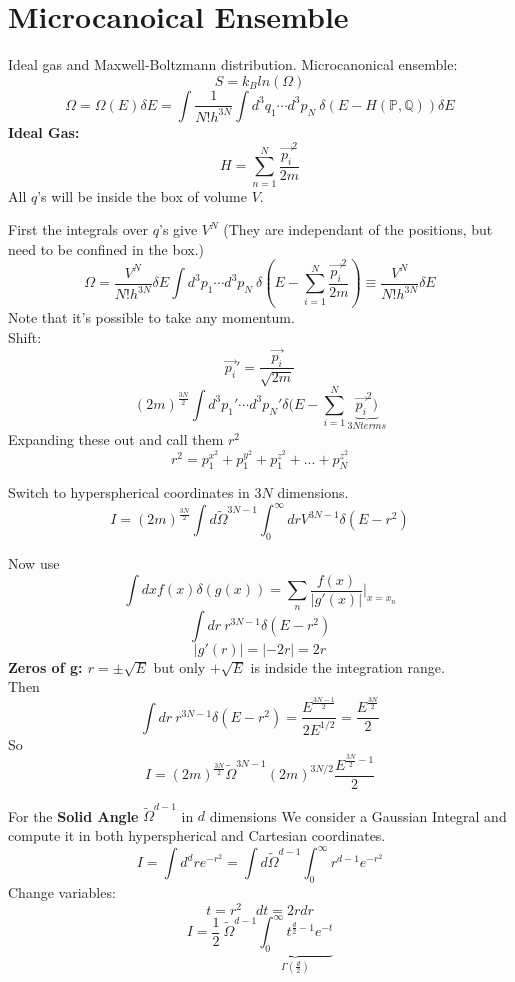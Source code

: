 \documentclass[11pt]{book}
\theoremstyle{definition}
\begin{document}
\section{Microcanoical Ensemble}
Ideal gas and Maxwell-Boltzmann distribution.
Microcanonical ensemble:
\[ S = k_B ln(\Omega) \] 
\[ \Omega = \Omega(E) \delta E  = \int \frac{1}{N!h^{3N}} \int d^3 q_1 \cdots d^3 p_N \: \delta (E- H(\mathbb{P}, \mathbb{Q})) \delta E \] 
\textbf{Ideal Gas:} 
\[ H = \sum_{n=1}^{N} \frac{\vec{p_i}^2}{2m}\] 
All $ q $'s will be inside the box of volume $ V $.

First the integrals over $ q $'s give $ V^{N} $ (They are independant of the positions, but need to be confined in the box.)
\[ \Omega = \frac{V^{N}}{N!h^{3N}} \delta E \int d^3p_1 \cdots d^3 p_N \: \delta (E - \sum_{i=1}^{N} \frac{\vec{p_i}^2}{2m}) \equiv \frac{V^{N}}{N! h^{3N}} \delta E \] 
Note that it's possible to take any momentum. \\
Shift:
\[ \vec{p_i}\prime = \frac{\vec{p_i}}{\sqrt{2m}} \]
\[(2m)^{\frac{3N}{2}} \int d^3p_1 \prime \cdots d^3p_N \prime \delta (E - \sum_{i=1}^{N} \underbrace{\vec{p_i}^2)}_{3N terms}\] 
Expanding these out and call them $ r^2 $
\[ r^2 = p_1^{{x}^2} + p_1^{{y}^2} + p_1^{{z}^2} + ... + p_N^{{z}^2} \] 
\begin{shaded*}
Switch to hyperspherical coordinates in $ 3N $ dimensions.
\[ I = (2m)^{\frac{3N}{2}} \int d \tilde \Omega^{3N-1} \int_0^{\infty} dr V^{3N-1} \delta (E-r^2)\] 
\end{shaded*}

Now use \[ \int dx f(x) \delta(g(x)) = \sum_{n} \frac{f(x)}{|g \prime (x)|} |_{x=x_n}\] 
\begin{equation}
	\label{eq:int-dr}
	\int dr \: r^{3N-1} \delta (E - r^2)
\end{equation} 
\[ |g \prime (r)| = |-2r| = 2r \] 
\textbf{Zeros of g: $ r = \pm \sqrt{E} $ } but only $ +\sqrt{E} $ is indside the integration range. \\
Then
\[ \int dr \: r^{3N-1} \delta (E - r^2) = \frac{E^{\frac{3N-1}{2}}}{2E^{1/2}} = \frac{E^{\frac{3N}{2}}}{2}\] 
So
\[ I = (2m)^{\frac{3N}{2}} \tilde \Omega^{3N-1} (2m)^{3N/2} \frac{E^{\frac{3N}{2}-1}}{2} \] 

For the \textbf{Solid Angle} $ \tilde \Omega^{d-1} $ in $ d $ dimensions 
We consider a Gaussian Integral and compute it in both hyperspherical and Cartesian coordinates.
\[ I = \int d^{d} r e^{-r^2} = \int d \tilde \Omega^{d-1} \int_0^{\infty} r^{d-1} e^{-r^2} \] 
Change variables:
\[ t = r^2 \quad dt = 2r dr \]
\[ I = \frac{1}{2} \: \tilde \Omega^{d-1} \underbrace{\int_0^{\infty} t^{\frac{d}{2}-1} e^{-t}}_{\Gamma(\frac{d}{2})}\]
\end{document}
